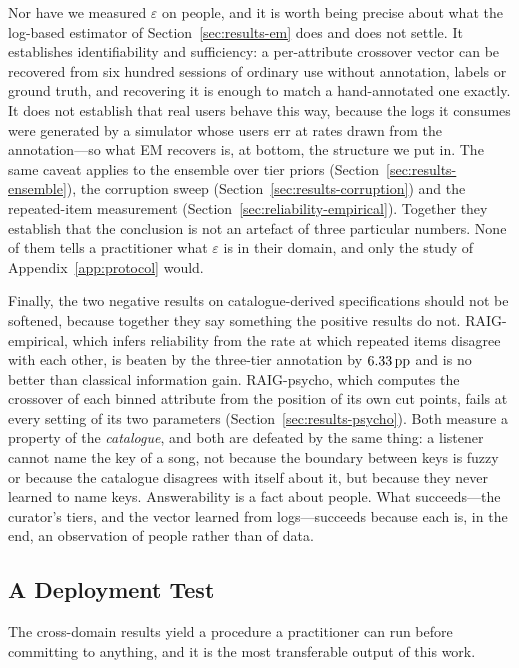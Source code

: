 Nor have we measured $\varepsilon$ on people, and it is worth being precise
about what the log-based estimator of Section~\ref{sec:results-em} does and
does not settle. It establishes identifiability and sufficiency: a
per-attribute crossover vector can be recovered from six hundred sessions of
ordinary use without annotation, labels or ground truth, and recovering it is
enough to match a hand-annotated one exactly. It does not establish that real
users behave this way, because the logs it consumes were generated by a
simulator whose users err at rates drawn from the annotation---so what EM
recovers is, at bottom, the structure we put in. The same caveat applies to
the ensemble over tier priors (Section~\ref{sec:results-ensemble}), the
corruption sweep (Section~\ref{sec:results-corruption}) and the repeated-item
measurement (Section~\ref{sec:reliability-empirical}). Together they establish
that the conclusion is not an artefact of three particular numbers. None of
them tells a practitioner what $\varepsilon$ is in their domain, and only the
study of Appendix~\ref{app:protocol} would.

Finally, the two negative results on catalogue-derived specifications should
not be softened, because together they say something the positive results do
not. RAIG-empirical, which infers reliability from the rate at which repeated
items disagree with each other, is beaten by the three-tier annotation by
$6.33\,\text{pp}$ and is no better than classical information gain. RAIG-psycho, which
computes the crossover of each binned attribute from the position of its own
cut points, fails at every setting of its two parameters
(Section~\ref{sec:results-psycho}). Both measure a property of the
\emph{catalogue}, and both are defeated by the same thing: a listener cannot
name the key of a song, not because the boundary between keys is fuzzy or
because the catalogue disagrees with itself about it, but because they never
learned to name keys. Answerability is a fact about people. What succeeds---the
curator's tiers, and the vector learned from logs---succeeds because each is,
in the end, an observation of people rather than of data.

\subsection{A Deployment Test}

The cross-domain results yield a procedure a practitioner can run before
committing to anything, and it is the most transferable output of this work.

